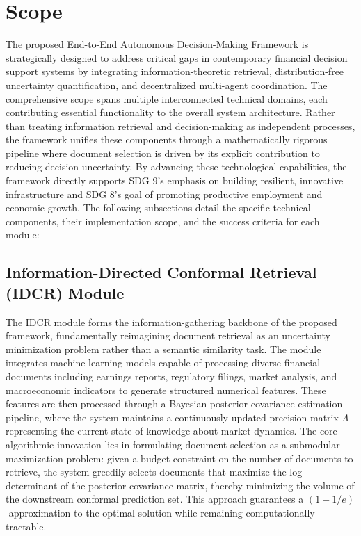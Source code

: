 \documentclass[12pt,a4paper,oneside]{report}
\theoremstyle{definition}
\theoremstyle{remark}
\begin{document}
\section{Scope}

The proposed End-to-End Autonomous Decision-Making Framework is strategically designed to address critical gaps in contemporary financial decision support systems by integrating information-theoretic retrieval, distribution-free uncertainty quantification, and decentralized multi-agent coordination. The comprehensive scope spans multiple interconnected technical domains, each contributing essential functionality to the overall system architecture. Rather than treating information retrieval and decision-making as independent processes, the framework unifies these components through a mathematically rigorous pipeline where document selection is driven by its explicit contribution to reducing decision uncertainty. By advancing these technological capabilities, the framework directly supports SDG 9's emphasis on building resilient, innovative infrastructure and SDG 8's goal of promoting productive employment and economic growth. The following subsections detail the specific technical components, their implementation scope, and the success criteria for each module:

\subsection{Information-Directed Conformal Retrieval (IDCR) Module}

The IDCR module forms the information-gathering backbone of the proposed framework, fundamentally reimagining document retrieval as an uncertainty minimization problem rather than a semantic similarity task. The module integrates machine learning models capable of processing diverse financial documents including earnings reports, regulatory filings, market analysis, and macroeconomic indicators to generate structured numerical features. These features are then processed through a Bayesian posterior covariance estimation pipeline, where the system maintains a continuously updated precision matrix $\Lambda$ representing the current state of knowledge about market dynamics. The core algorithmic innovation lies in formulating document selection as a submodular maximization problem: given a budget constraint on the number of documents to retrieve, the system greedily selects documents that maximize the log-determinant of the posterior covariance matrix, thereby minimizing the volume of the downstream conformal prediction set. This approach guarantees a $(1-1/e)$-approximation to the optimal solution while remaining computationally tractable.
\end{document}
